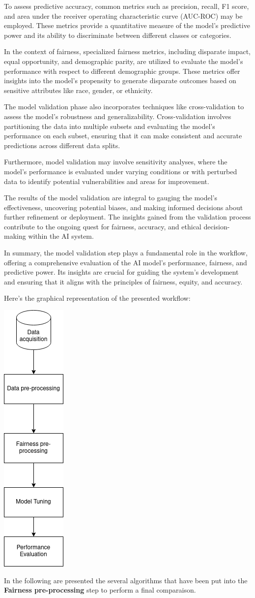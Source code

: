 \documentclass[12pt,a4paper,openright,twoside]{book}
\begin{document}
To assess predictive accuracy, common metrics such as precision, recall, F1 score, and area under the receiver operating characteristic curve (AUC-ROC) may be employed. These metrics provide a quantitative measure of the model's predictive power and its ability to discriminate between different classes or categories. 

In the context of fairness, specialized fairness metrics, including disparate impact, equal opportunity, and demographic parity, are utilized to evaluate the model's performance with respect to different demographic groups. These metrics offer insights into the model's propensity to generate disparate outcomes based on sensitive attributes like race, gender, or ethnicity. 

The model validation phase also incorporates techniques like cross-validation to assess the model's robustness and generalizability. Cross-validation involves partitioning the data into multiple subsets and evaluating the model's performance on each subset, ensuring that it can make consistent and accurate predictions across different data splits. 

Furthermore, model validation may involve sensitivity analyses, where the model's performance is evaluated under varying conditions or with perturbed data to identify potential vulnerabilities and areas for improvement. 

The results of the model validation are integral to gauging the model's effectiveness, uncovering potential biases, and making informed decisions about further refinement or deployment. The insights gained from the validation process contribute to the ongoing quest for fairness, accuracy, and ethical decision-making within the AI system. 

In summary, the model validation step plays a fundamental role in the workflow, offering a comprehensive evaluation of the AI model's performance, fairness, and predictive power. Its insights are crucial for guiding the system's development and ensuring that it aligns with the principles of fairness, equity, and accuracy. 


Here's the graphical representation of the presented workflow:
\begin{center}
\includegraphics[width=.2\textwidth, height=0.6\textwidth]{FbD.png}
\end{center}
\newpage
In the following are presented the several algorithms that have been put into the \textbf{Fairness pre-processing} step to perform a final comparaison.
\end{document}
